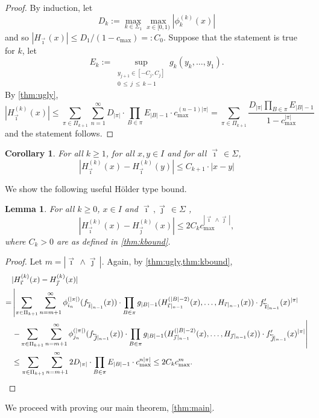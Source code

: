 \documentclass[12pt,]{article}
\newtheorem{corollary}[theorem]{Corollary}
\newtheorem{lemma}[theorem]{Lemma}
\theoremstyle{definition}
\theoremstyle{remark}
\newcommand{\0}{\mathbf{0}}
\newcommand{\cev}[1]{\reflectbox{\ensuremath{\vec{\reflectbox{\ensuremath{#1}}}}}}
\newcommand{\bi}{\vec{\imath}\,}
\newcommand{\bj}{\vec{\jmath}\,}
\newcommand{\bbi}{\,\cev{\imath}}
\newcommand{\bbj}{\,\cev{\jmath}}
\begin{document}
\begin{proof}
  By induction, let
  \[
    D_k:=\max_{k\in\Sigma_1}\max_{x\in[0,1)} |\phi_k^{(k)}(x)|
  \]
  and so
  $|H_{\bi}(x)| \leq D_1/(1-c_{\max})=:C_0$.
  Suppose that the statement is true for $k$, let
  \[
    E_k:= \sup_{\substack{y_{j+1}\in[-C_j,C_j]\\0\,\leq\, j \,\leq\, k-1}}g_k(y_k,\dots,y_1).
  \]
  By \cref{thm:ugly},
  \[
    |H_{\bi}^{(k)}(x)| \leq \sum_{\pi\in\Pi_{k+1}}\sum_{n=1}^\infty D_{|\pi|} \cdot \prod_{B\in\pi}
    E_{|B|-1} \cdot c_{\max}^{(n-1)|\pi|}
    = \sum_{\pi\in\Pi_{k+1}} \frac{D_{|\pi|}\prod_{B\in\pi}E_{|B|-1}}{1-c_{\max}^{|\pi|}}
  \]
  and the statement follows.
\end{proof}
\begin{corollary}
  \label{thm:difcor}
  For all $k\geq 1$, for all $x,y\in I$ and for all $\bi\in\Sigma$,
  \[
    |H_{\bi}^{(k)}(x) - H_{\bi}^{(k)}(y)| \leq C_{k+1}\cdot |x-y|
  \]
\end{corollary}
We show the following useful H\"older type bound.
\begin{lemma}\label{thm:difbound}
  For all $k\geq 0$, $x\in I$ and $\bi,\bj\in\Sigma$ ,
  \[
    |H_{\bi}^{(k)}(x) - H_{\bj}^{(k)}(x)| \leq 2C_k c_{\max}^{|\bi\wedge\bj|},
  \]
  where $C_k>0$ are as defined in \cref{thm:kbound}.
\end{lemma}
\begin{proof}
  Let $m = |\bi\wedge\bj|$. Again, by \cref{thm:ugly,thm:kbound},
  \begin{align}
    &|H_{\bi}^{(k)}(x) - H_{\bj}^{(k)}(x)|
    \nonumber\\
    =&
    \left|
    \sum_{\pi\in\Pi_{k+1}}\sum_{n=m+1}^\infty \phi_{i_n}^{(|\pi|)}(f_{\bbi|_{n-1}}(x))\cdot
    \prod_{B\in\pi} g_{|B|-1}(H_{\bi|_{n-1}}^{(|B|-2)}(x),\dots,H_{\bi|_{n-1}}(x)) \cdot
    f_{\bbi|_{n-1}}'(x)^{|\pi|}
  \right.
  \nonumber\\
     &
     \left. -
       \sum_{\pi\in\Pi_{k+1}}\sum_{n=m+1}^\infty \phi_{j_n}^{(|\pi|)}(f_{\bbj|_{n-1}}(x))\cdot
       \prod_{B\in\pi} g_{|B|-1}(H_{\bj|_{n-1}}^{(|B|-2)}(x),\dots,H_{\bj|_{n-1}}(x)) \cdot
       f_{\bbj|_{n-1}}'(x)^{|\pi|}
       \right|\nonumber\\
     &\leq
     \sum_{\pi\in\Pi_{k+1}}\sum_{n=m+1}^\infty 2D_{|\pi|}\cdot \prod_{B\in\pi} E_{|B|-1}
     \cdot c_{\max}^{n|\pi|} \leq 2 C_{k} c_{\max}^m.\nonumber
     \qedhere
  \end{align}
\end{proof}
We proceed with proving our main theorem, \cref{thm:main}.
\end{document}
